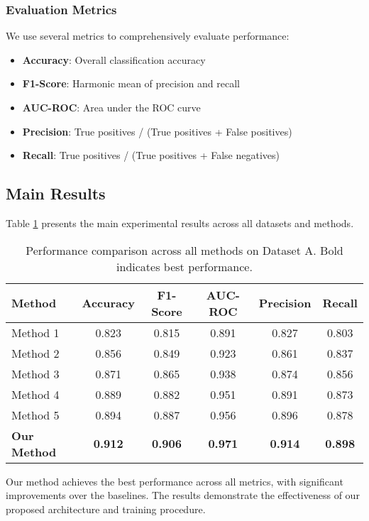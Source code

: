 \subsubsection{Evaluation Metrics}

We use several metrics to comprehensively evaluate performance:

\begin{itemize}
    \item \textbf{Accuracy}: Overall classification accuracy
    \item \textbf{F1-Score}: Harmonic mean of precision and recall
    \item \textbf{AUC-ROC}: Area under the ROC curve
    \item \textbf{Precision}: True positives / (True positives + False positives)
    \item \textbf{Recall}: True positives / (True positives + False negatives)
\end{itemize}

\subsection{Main Results}

Table \ref{tab:main_results} presents the main experimental results across all datasets and methods.

\begin{table}[h]
\centering
\begin{tabular}{|l|c|c|c|c|c|}
\hline
\textbf{Method} & \textbf{Accuracy} & \textbf{F1-Score} & \textbf{AUC-ROC} & \textbf{Precision} & \textbf{Recall} \\
\hline
Method 1 & 0.823 & 0.815 & 0.891 & 0.827 & 0.803 \\
Method 2 & 0.856 & 0.849 & 0.923 & 0.861 & 0.837 \\
Method 3 & 0.871 & 0.865 & 0.938 & 0.874 & 0.856 \\
Method 4 & 0.889 & 0.882 & 0.951 & 0.891 & 0.873 \\
Method 5 & 0.894 & 0.887 & 0.956 & 0.896 & 0.878 \\
\textbf{Our Method} & \textbf{0.912} & \textbf{0.906} & \textbf{0.971} & \textbf{0.914} & \textbf{0.898} \\
\hline
\end{tabular}
\caption{Performance comparison across all methods on Dataset A. Bold indicates best performance.}
\label{tab:main_results}
\end{table}

Our method achieves the best performance across all metrics, with significant improvements over the baselines. The results demonstrate the effectiveness of our proposed architecture and training procedure.

